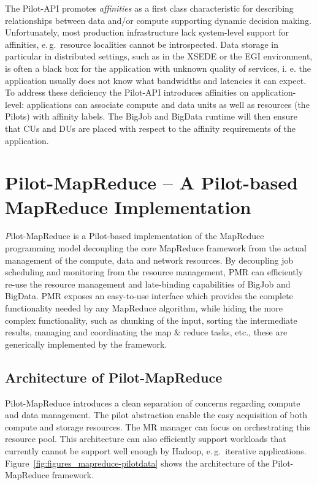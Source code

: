 \documentclass{acm_proc_article-sp}
\newcommand{\alnote}[1]{ {\textcolor{blue} { ***andreL: #1 }}}
\newcommand{\alnote}[1]{}
\newcommand{\pilot}{Pilot\xspace}
\newcommand{\pilots}{Pilots\xspace}
\newcommand{\pilotmapreduce}{Pilot-MapReduce\xspace}
\begin{document}
The Pilot-API promotes \emph{affinities} as a first class characteristic for
describing relationships between data and/or compute supporting dynamic decision
making. Unfortunately, most production infrastructure lack system-level support
for affinities, e.\,g.\ resource localities cannot be introspected. Data storage
in particular in distributed settings, such as in the XSEDE or the EGI
environment, is often a black box for the application with unknown quality of
services, i. e. the application usually does not know what bandwidths and
latencies it can expect. To address these deficiency the Pilot-API introduces 
affinities on application-level: applications can associate compute and data 
units as well as resources  (the \pilots) with affinity labels. The BigJob and 
BigData runtime will then ensure that CUs and DUs are placed with respect to the 
affinity requirements of the application.


\section{Pilot-MapReduce -- A Pilot-based MapReduce Implementation}
\label{sec-pilot-mr}


{\emph \pilotmapreduce}  is a \pilot-based implementation of the 
MapReduce programming model decoupling the core MapReduce framework from the 
actual management of the compute, data and network resources. By decoupling 
job scheduling and monitoring from the resource management, PMR 
can efficiently re-use the resource management and late-binding capabilities 
of BigJob and BigData. PMR exposes an easy-to-use interface which provides the complete
functionality needed by any MapReduce algorithm, while hiding the more complex
functionality, such as chunking of the input, sorting the intermediate
results, managing and coordinating the map \& reduce tasks, etc., these are generically
implemented by the framework. 






\subsection{Architecture of \pilotmapreduce}
\pilotmapreduce introduces a clean separation of concerns regarding compute and
data management. The pilot abstraction enable the easy acquisition of both
compute and storage resources. The MR manager can focus on orchestrating this
resource pool. This architecture can also efficiently support workloads that
currently cannot be support well enough by Hadoop, e.\,g.\ iterative
applications. Figure~\ref{fig:figures_mapreduce-pilotdata} shows the
architecture of the \pilotmapreduce framework.
\end{document}
